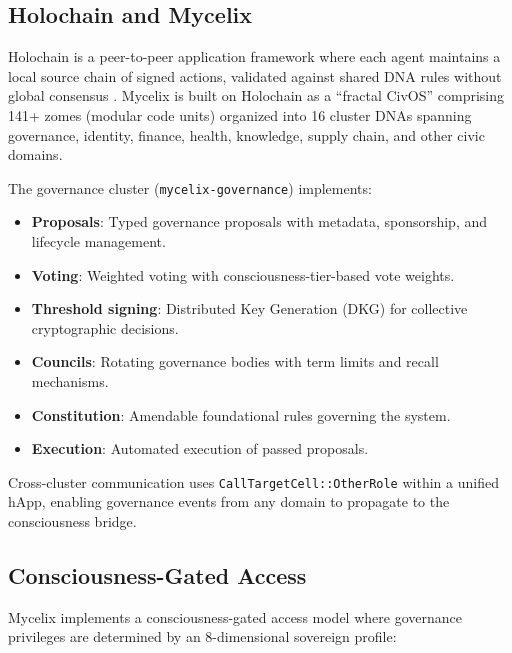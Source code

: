 \documentclass[11pt,a4paper]{article}
\begin{document}
\subsection{Holochain and Mycelix}

Holochain is a peer-to-peer application framework where each agent maintains a local source chain of signed actions, validated against shared DNA rules without global consensus \citep{harris2018holochain}.
Mycelix is built on Holochain as a ``fractal CivOS'' comprising 141+ zomes (modular code units) organized into 16 cluster DNAs spanning governance, identity, finance, health, knowledge, supply chain, and other civic domains.

The governance cluster (\texttt{mycelix-governance}) implements:
\begin{itemize}
  \item \textbf{Proposals}: Typed governance proposals with metadata, sponsorship, and lifecycle management.
  \item \textbf{Voting}: Weighted voting with consciousness-tier-based vote weights.
  \item \textbf{Threshold signing}: Distributed Key Generation (DKG) for collective cryptographic decisions.
  \item \textbf{Councils}: Rotating governance bodies with term limits and recall mechanisms.
  \item \textbf{Constitution}: Amendable foundational rules governing the system.
  \item \textbf{Execution}: Automated execution of passed proposals.
\end{itemize}

Cross-cluster communication uses \texttt{CallTargetCell::OtherRole} within a unified hApp, enabling governance events from any domain to propagate to the consciousness bridge.

\subsection{Consciousness-Gated Access}

Mycelix implements a consciousness-gated access model where governance privileges are determined by an 8-dimensional sovereign profile:
\end{document}
